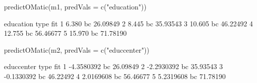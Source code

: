 \begin{Schunk}
\begin{Sinput}
 predictOMatic(m1, predVals = c("education"))
\end{Sinput}
\begin{Soutput}
  education type      fit
1     6.380   bc 26.09849
2     8.445   bc 35.93543
3    10.605   bc 46.22492
4    12.755   bc 56.46677
5    15.970   bc 71.78190
\end{Soutput}
\begin{Sinput}
 predictOMatic(m2, predVals = c("educcenter"))
\end{Sinput}
\begin{Soutput}
  educcenter type      fit
1 -4.3580392   bc 26.09849
2 -2.2930392   bc 35.93543
3 -0.1330392   bc 46.22492
4  2.0169608   bc 56.46677
5  5.2319608   bc 71.78190
\end{Soutput}
\end{Schunk}
